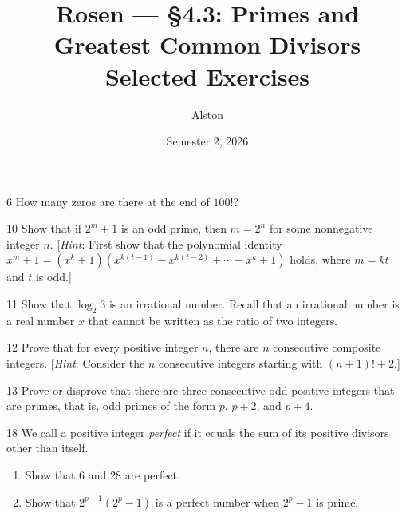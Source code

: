 \documentclass[11pt]{article}
\title{Rosen --- \S 4.3: Primes and Greatest Common Divisors\\ \large Selected Exercises}
\author{Alston}
\date{Semester 2, 2026}
\begin{document}
\maketitle

\begin{exercise}{6}
    How many zeros are there at the end of $100!$?
\end{exercise}

\begin{exercise}{10}
    Show that if $2^m + 1$ is an odd prime, then $m = 2^n$ for some
    nonnegative integer $n$.
    [\emph{Hint}: First show that the polynomial identity
    $x^m + 1 = (x^k+1)(x^{k(t-1)} - x^{k(t-2)} + \cdots - x^k + 1)$
    holds, where $m = kt$ and $t$ is odd.]
\end{exercise}

\begin{exercise}{11}
    Show that $\log_2 3$ is an irrational number. Recall that an
    irrational number is a real number $x$ that cannot be written as
    the ratio of two integers.
\end{exercise}

\begin{exercise}{12}
    Prove that for every positive integer $n$, there are $n$
    consecutive composite integers.
    [\emph{Hint}: Consider the $n$ consecutive integers starting with
    $(n+1)! + 2$.]
\end{exercise}

\begin{exercise}{13}
    Prove or disprove that there are three consecutive odd positive
    integers that are primes, that is, odd primes of the form $p$,
    $p+2$, and $p+4$.
\end{exercise}

\begin{exercise}{18}
    We call a positive integer \emph{perfect} if it equals the sum of
    its positive divisors other than itself.
    \begin{enumerate}[label=(\alph*)]
        \item Show that 6 and 28 are perfect.
        \item Show that $2^{p-1}(2^p - 1)$ is a perfect number when
        $2^p - 1$ is prime.
    \end{enumerate}
\end{exercise}
\end{document}

